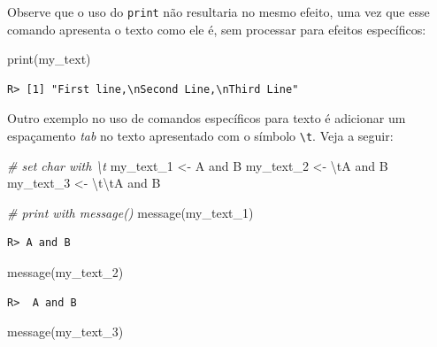 \documentclass[
  11pt,
]{book}
\newenvironment{Shaded}{\begin{snugshade}}{\end{snugshade}}
\newcommand{\CommentTok}[1]{\textcolor[rgb]{0.37,0.37,0.37}{\textit{#1}}}
\newcommand{\FunctionTok}[1]{\textcolor[rgb]{0,0,0}{#1}}
\newcommand{\NormalTok}[1]{#1}
\newcommand{\OtherTok}[1]{\textcolor[rgb]{0.37,0.37,0.37}{#1}}
\newcommand{\SpecialCharTok}[1]{\textcolor[rgb]{0,0,0}{#1}}
\newcommand{\StringTok}[1]{\textcolor[rgb]{0.5,0.5,0.5}{#1}}
\begin{document}
Observe que o uso do \texttt{print} não resultaria no mesmo efeito, uma vez que esse comando apresenta o texto como ele é, sem processar para efeitos específicos:

\begin{Shaded}
\begin{Highlighting}[]
\FunctionTok{print}\NormalTok{(my\_text)}
\end{Highlighting}
\end{Shaded}

\begin{verbatim}
R> [1] "First line,\nSecond Line,\nThird Line"
\end{verbatim}

Outro exemplo no uso de comandos específicos para texto é adicionar um espaçamento \emph{tab} no texto apresentado com o símbolo \texttt{\textbackslash{}t}. Veja a seguir:

\begin{Shaded}
\begin{Highlighting}[]
\CommentTok{\# set char with \textbackslash{}t}
\NormalTok{my\_text\_1 }\OtherTok{\textless{}{-}} \StringTok{\textquotesingle{}A and B\textquotesingle{}}
\NormalTok{my\_text\_2 }\OtherTok{\textless{}{-}} \StringTok{\textquotesingle{}}\SpecialCharTok{\textbackslash{}t}\StringTok{A and B\textquotesingle{}}
\NormalTok{my\_text\_3 }\OtherTok{\textless{}{-}} \StringTok{\textquotesingle{}}\SpecialCharTok{\textbackslash{}t\textbackslash{}t}\StringTok{A and B\textquotesingle{}}

\CommentTok{\# print with message()}
\FunctionTok{message}\NormalTok{(my\_text\_1)}
\end{Highlighting}
\end{Shaded}

\begin{verbatim}
R> A and B
\end{verbatim}

\begin{Shaded}
\begin{Highlighting}[]
\FunctionTok{message}\NormalTok{(my\_text\_2)}
\end{Highlighting}
\end{Shaded}

\begin{verbatim}
R>  A and B
\end{verbatim}

\begin{Shaded}
\begin{Highlighting}[]
\FunctionTok{message}\NormalTok{(my\_text\_3)}
\end{Highlighting}
\end{Shaded}
\end{document}

